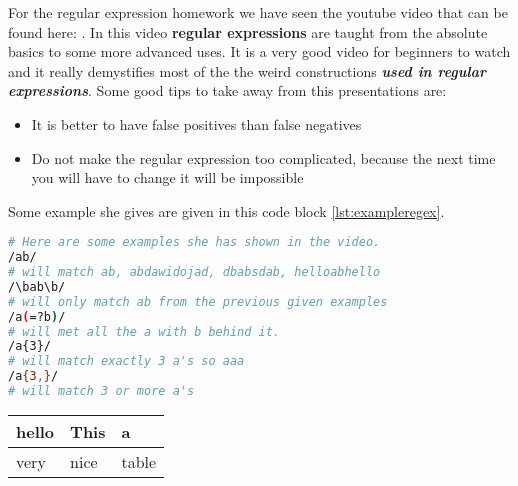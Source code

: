For the regular expression homework we have seen the youtube video that can be found here: \cite{leaverou1}. In this video \textbf{regular expressions} are taught from the absolute basics to some more advanced uses. It is a very good video for beginners to watch and it really demystifies most of the the weird constructions \textbf{\textit{used in regular expressions}}. Some good tips to take away from this presentations are:
\begin{itemize}
\item It is better to have false positives than false negatives
\item Do not make the regular expression too complicated, because the next time you will have to change it will be impossible
\end{itemize}
Some example she gives are given in this code block \ref{lst:exampleregex}.

\begin{lstlisting}[language=bash,label=lst:exampleregex,caption=Regex examples]
# Here are some examples she has shown in the video.
/ab/
# will match ab, abdawidojad, dbabsdab, helloabhello
/\bab\b/ 
# will only match ab from the previous given examples
/a(=?b)/
# will met all the a with b behind it.
/a{3}/
# will match exactly 3 a's so aaa
/a{3,}/
# will match 3 or more a's
\end{lstlisting}

\begin{tabular}{|l|l|l|}
\hline
hello & This & a \\ \hline
very & nice & table\\ \hline

\end{tabular}
